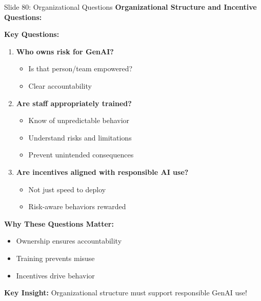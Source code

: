 \documentclass[8pt]{beamer}
\begin{document}
	\begin{frame}{Slide 80: Organizational Questions}
		\fontsize{6.5}{7.5}\selectfont
		\textbf{Organizational Structure and Incentive Questions:}
		
		\vspace{0.1cm}
		\textbf{Key Questions:}
		\begin{enumerate}
			\item \textbf{Who owns risk for GenAI?}
			\begin{itemize}
				\item Is that person/team empowered?
				\item Clear accountability
			\end{itemize}
			\item \textbf{Are staff appropriately trained?}
			\begin{itemize}
				\item Know of unpredictable behavior
				\item Understand risks and limitations
				\item Prevent unintended consequences
			\end{itemize}
			\item \textbf{Are incentives aligned with responsible AI use?}
			\begin{itemize}
				\item Not just speed to deploy
				\item Risk-aware behaviors rewarded
			\end{itemize}
		\end{enumerate}
		
		\vspace{0.1cm}
		\textbf{Why These Questions Matter:}
		\begin{itemize}
			\item Ownership ensures accountability
			\item Training prevents misuse
			\item Incentives drive behavior
		\end{itemize}
		
		\textcolor{myblue}{\textbf{Key Insight:}} Organizational structure must \textcolor{myblue}{support responsible GenAI use}!
	\end{frame}
	
\end{document}
